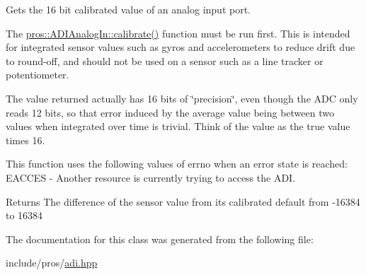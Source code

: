 Gets the 16 bit calibrated value of an analog input port. 

The \mbox{\hyperlink{classpros_1_1ADIAnalogIn_ac8dd1e625cbcec4951d20be0c0fa2d3c}{pros\+::\+A\+D\+I\+Analog\+In\+::calibrate()}} function must be run first. This is intended for integrated sensor values such as gyros and accelerometers to reduce drift due to round-\/off, and should not be used on a sensor such as a line tracker or potentiometer.

The value returned actually has 16 bits of \char`\"{}precision\char`\"{}, even though the A\+DC only reads 12 bits, so that error induced by the average value being between two values when integrated over time is trivial. Think of the value as the true value times 16.

This function uses the following values of errno when an error state is reached\+: E\+A\+C\+C\+ES -\/ Another resource is currently trying to access the A\+DI.

\begin{DoxyReturn}{Returns}
The difference of the sensor value from its calibrated default from -\/16384 to 16384 
\end{DoxyReturn}


The documentation for this class was generated from the following file\+:\begin{DoxyCompactItemize}
\item 
include/pros/\mbox{\hyperlink{adi_8hpp}{adi.\+hpp}}\end{DoxyCompactItemize}
